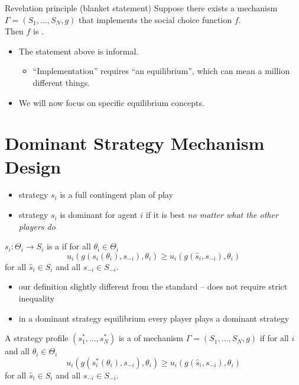 \documentclass[english]{beamer}		%
\def\lyxframeend{} %
\begin{document}
\begin{block}{Revelation principle (blanket statement)}
	Suppose there exists a mechanism $\Gamma=(S_{1},\dots,S_{N},g)$ that implements the social choice function $f$.\\ Then $f$ is .
\end{block}
\pause\medskip
\begin{itemize}
	\item The statement above is informal.
	\begin{itemize}
		\item ``Implementation'' requires ``an equilibrium'', which can mean a million different things.
	\end{itemize}
	\item We will now focus on specific equilibrium concepts.
\end{itemize}
\lyxframeend





\section{Dominant Strategy Mechanism Design}

\begin{itemize}
	\item strategy $s_i$ is a full contingent plan of play
	\item strategy $s_i$ is dominant for agent $i$ if it is best \emph{no matter what the other players do}
\end{itemize}
\begin{definition}
	$s_{i}: \Theta_{i}\rightarrow S_{i}$ is a  if for all $\theta_{i}\in \Theta_{i}$
	$$ u_{i}(g(s_{i}(\theta_{i}),s_{-i}),\theta_{i})\geq u_{i}(g(\hat s_{i},s_{-i}),\theta_{i})$$
	for all $\hat s_{i}\in S_{i}$  and all $s_{-i}\in S_{-i}$.
\end{definition}
\pause
\begin{itemize}
	\item our definition slightly different from the standard -- does not require strict inequality
\end{itemize}
\lyxframeend


\begin{itemize}
	\item in a dominant strategy equilibrium every player plays a dominant strategy
\end{itemize}
\begin{definition}
	A strategy profile $(s_1^*,\dots,s_N^*)$ is a  of mechanism  $\Gamma=(S_{1},\dots,S_{N},g)$ if for all $i$ and all $\theta_{i}\in \Theta_{i}$
	$$ u_{i}(g(s_{i}^{*}(\theta_{i}),s_{-i}),\theta_{i})\geq u_{i}(g(\hat s_{i},s_{-i}),\theta_{i})$$
	for all $\hat s_{i}\in S_{i}$ and all $s_{-i}\in S_{-i}$.
\end{definition}
\lyxframeend
\end{document}

